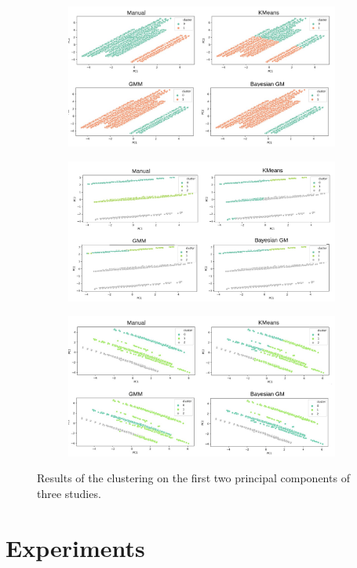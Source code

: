 \begin{figure}[H]
    \begin{subfigure}{\linewidth}
        \raggedright
        \includegraphics[width=9cm]{fig/ch3-cluster-algo-ex1.png}
        \caption{}
        \label{fig:cluster-algo:ex1}
    \end{subfigure}
    \begin{subfigure}{\linewidth}
        \raggedleft
        \includegraphics[width=9cm]{fig/ch3-cluster-algo-ex2.png}
        \caption{}
        \label{fig:cluster-algo:ex2}
    \end{subfigure}
    \begin{subfigure}{\linewidth}
        \raggedright
        \includegraphics[width=9cm]{fig/ch3-cluster-algo-ex3.png}
        \caption{}
        \label{fig:cluster-algo:ex3}
    \end{subfigure}
    \caption{Results of the clustering on the first two principal components of three studies.}
    \label{fig:cluster-algo}
\end{figure}

\section{Experiments}

